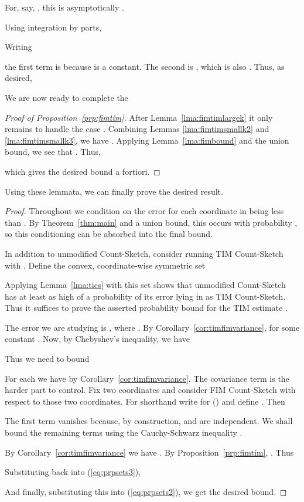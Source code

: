 \documentclass[letterpaper,11pt]{article}
\makeatletter
\newcommand{\state}[1]{\begin{thmtypealt@#1}
    \@nameuse{thm@#1}
  \end{thmtypealt@#1}
}
\newenvironment{proof*}[1][\proofname]{\par 
\normalfont \partopsep=\z@skip \topsep=\z@skip 
  \trivlist 
  \item[\hskip\labelsep 
        \itshape 
    #1\@addpunct{.}]\ignorespaces 
}{\endtrivlist\@endpefalse 
}
\makeatother
\begin{document}
\begin{proof*}
For, say, , this is asymptotically .

Using integration by parts,

Writing

the first term is  because  is a constant.
The second is , which is
also .  Thus, as desired,

\end{proof*}

We are now ready to complete the

\begin{proof}[Proof of Proposition~\ref{prp:fimtim}]
After Lemma~\ref{lma:fimtimlargek} it only remains to handle the case .
Combining Lemmas \ref{lma:fimtimsmallk2} and \ref{lma:fimtimsmallk3}, we have
.  Applying
Lemma~\ref{lma:fimbound} and the union bound, we see that
.  Thus,

which gives the desired bound a fortiori.
\end{proof}

Using these lemmata, we can finally prove the desired result.

\state{prp:sets}
\begin{proof}
Throughout we condition on the error for each coordinate in 
being less than .  By Theorem~\ref{thm:main} and a union bound,
this occurs with probability ,
so this conditioning can be absorbed into the final bound.

In addition to unmodified Count-Sketch, consider running TIM Count-Sketch
with .  Define the convex, coordinate-wise symmetric set

Applying Lemma~\ref{lma:tics} with this set  shows that
unmodified Count-Sketch has at least as high of a probability
of its error lying in  as TIM Count-Sketch.  Thus it suffices
to prove the asserted probability bound
for the TIM estimate .

The error we are studying is ,
where .  By Corollary~\ref{cor:timfimvariance},
 for some constant .  Now, by Chebyshev's inequality, we have 

Thus we need to bound

For each  we have 
by Corollary~\ref{cor:timfimvariance}.  The covariance term is the harder part to control.
Fix two coordinates  and consider FIM Count-Sketch with
respect to those two coordinates.  For shorthand write  for 
() and define .  Then

The first term vanishes because, by construction,  and 
are independent.  We shall bound the remaining terms using the Cauchy-Schwarz inequality
.  

By Corollary~\ref{cor:timfimvariance} we have
.
By Proposition~\ref{prp:fimtim}, .
Thus

Substituting back into (\ref{eq:prpsets3}),

And finally, substituting this into (\ref{eq:prpsets2}), we get the desired bound.
\end{proof}
\end{document}
